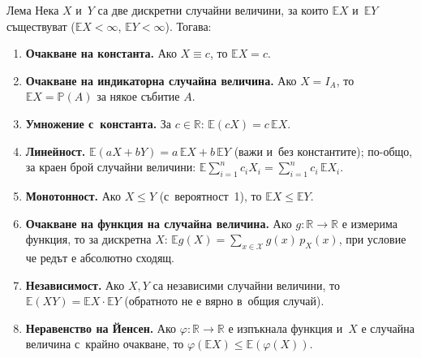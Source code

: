 \begin{thmbox}[]{Лема}
Нека $X$ и~$Y$ са две дискретни случайни величини, за които
$\mathbb E X$ и~$\mathbb E Y$ съществуват ($\mathbb EX<\infty$,
$\mathbb EY<\infty$). Тогава:
\begin{enumerate}[label=\arabic*)]
  \item \textbf{Очакване на константа.} Ако $X\equiv c$, то $\mathbb E X = c$.
  \item \textbf{Очакване на индикаторна случайна величина.} Ако $X=I_A$, то $\mathbb EX = \mathbb P(A)$ за някое събитие $A$.
  \item \textbf{Умножение с~константа.} За $c\in\mathbb R$: $\mathbb E(cX) = c\,\mathbb EX$.
  \item \textbf{Линейност.} $\mathbb E(aX+bY) = a\,\mathbb EX + b\,\mathbb EY$ (важи и~без константите); по-общо, за краен брой случайни величини: $\mathbb E\sum_{i=1}^n c_iX_i = \sum_{i=1}^n c_i\,\mathbb EX_i$.
  \item \textbf{Монотонност.} Ако $X\le Y$ (с~вероятност~1), то $\mathbb EX\le\mathbb EY$.
  \item \textbf{Очакване на функция на случайна величина.} Ако $g:\mathbb R\to\mathbb R$ е измерима функция, то за дискретна $X$: $\mathbb Eg(X) = \sum_{x\in\mathcal X} g(x)\,p_X(x)$, при условие че редът е абсолютно сходящ.
  \item \textbf{Независимост.} Ако $X,Y$ са независими случайни величини, то $\mathbb E(XY)=\mathbb EX\cdot\mathbb EY$ (обратното не е вярно в~общия случай).
  \item \textbf{Неравенство на Йенсен.} Ако $\varphi:\mathbb R\to\mathbb R$ е изпъкнала функция и~$X$ е случайна величина с~крайно очакване, то $\varphi(\mathbb EX)\le\mathbb E(\varphi(X))$.
\end{enumerate}
\end{thmbox}

